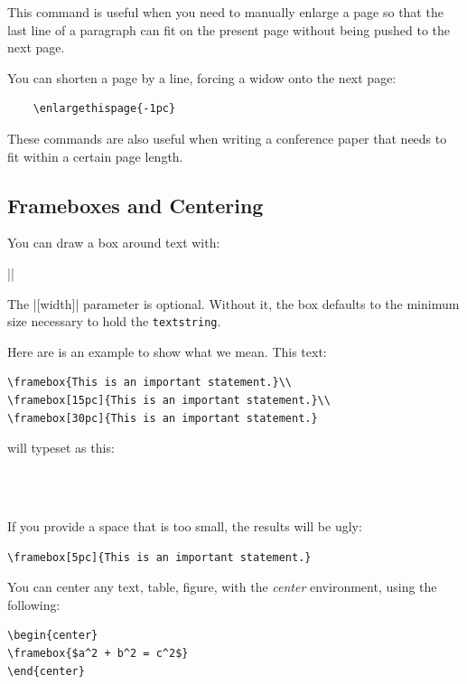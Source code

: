 This command is useful when you need to manually enlarge a page so that the
last line of a paragraph can fit on the present page without being pushed to
the next page. 

You can shorten a page by a line, forcing a widow onto the next page:

\begin{verbatim}
    \enlargethispage{-1pc}
\end{verbatim}


These commands are also useful when writing a conference paper that
needs to fit within a certain page length.

\subsection{Frameboxes and Centering}

You can draw a box around text with:

||

The |[width]| parameter is optional. Without it, the box defaults to the
minimum size necessary to hold the \texttt{textstring}.

Here are is an example to show what we mean. This text:

\begin{Verbatim}
\framebox{This is an important statement.}\\
\framebox[15pc]{This is an important statement.}\\
\framebox[30pc]{This is an important statement.}
\end{Verbatim}

will typeset as this:

\\
\\

If you provide a space that is too small, the results will be ugly:

\begin{Verbatim}
\framebox[5pc]{This is an important statement.}
\end{Verbatim}


You can center any text, table, figure, \etc with the \emph{center}
environment, using the following:

\begin{Verbatim}
\begin{center}
\framebox{$a^2 + b^2 = c^2$}
\end{center}
\end{Verbatim}

